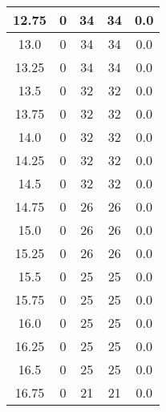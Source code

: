 \documentclass[letterpaper, 12pt]{article}
\begin{document}
\begin{longtable}{|c|c|c|c|c|}
\hline
12.75 & 0 & 34 & 34 & 0.0 \\
\hline
13.0 & 0 & 34 & 34 & 0.0 \\
\hline
13.25 & 0 & 34 & 34 & 0.0 \\
\hline
13.5 & 0 & 32 & 32 & 0.0 \\
\hline
13.75 & 0 & 32 & 32 & 0.0 \\
\hline
14.0 & 0 & 32 & 32 & 0.0 \\
\hline
14.25 & 0 & 32 & 32 & 0.0 \\
\hline
14.5 & 0 & 32 & 32 & 0.0 \\
\hline
14.75 & 0 & 26 & 26 & 0.0 \\
\hline
15.0 & 0 & 26 & 26 & 0.0 \\
\hline
15.25 & 0 & 26 & 26 & 0.0 \\
\hline
15.5 & 0 & 25 & 25 & 0.0 \\
\hline
15.75 & 0 & 25 & 25 & 0.0 \\
\hline
16.0 & 0 & 25 & 25 & 0.0 \\
\hline
16.25 & 0 & 25 & 25 & 0.0 \\
\hline
16.5 & 0 & 25 & 25 & 0.0 \\
\hline
16.75 & 0 & 21 & 21 & 0.0 \\
\hline
\end{longtable}
\end{document}
